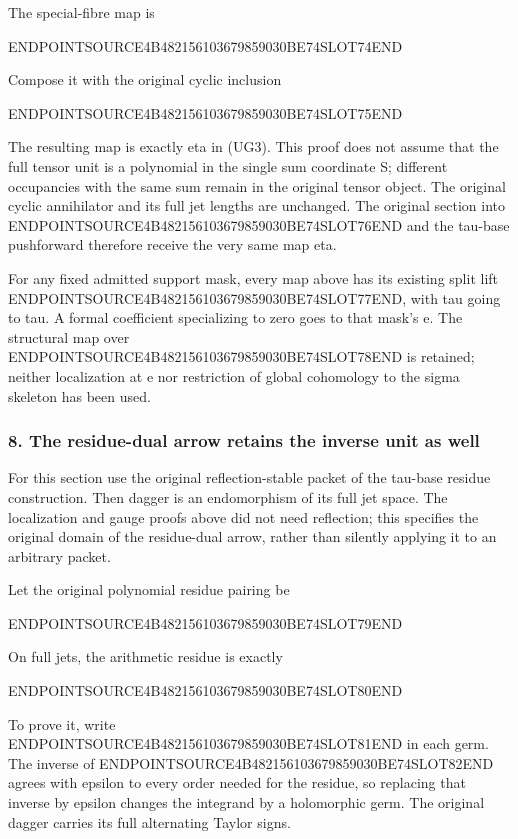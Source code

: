 The special-fibre map is

ENDPOINTSOURCE4B482156103679859030BE74SLOT74END

Compose it with the original cyclic inclusion

ENDPOINTSOURCE4B482156103679859030BE74SLOT75END

The resulting map is exactly eta in (UG3). This proof does not assume that the full tensor unit is a polynomial in the single sum coordinate S; different occupancies with the same sum remain in the original tensor object. The original cyclic annihilator and its full jet lengths are unchanged. The original section into ENDPOINTSOURCE4B482156103679859030BE74SLOT76END and the tau-base pushforward therefore receive the very same map eta.

For any fixed admitted support mask, every map above has its existing split lift ENDPOINTSOURCE4B482156103679859030BE74SLOT77END, with tau going to tau. A formal coefficient specializing to zero goes to that mask's e. The structural map over ENDPOINTSOURCE4B482156103679859030BE74SLOT78END is retained; neither localization at e nor restriction of global cohomology to the sigma skeleton has been used.

\subsubsection{8. The residue-dual arrow retains the inverse unit as well}\label{endpoint-f1_unit_gauge--the-residue-dual-arrow-retains-the-inverse-unit-as-well}

For this section use the original reflection-stable packet of the tau-base residue construction. Then dagger is an endomorphism of its full jet space. The localization and gauge proofs above did not need reflection; this specifies the original domain of the residue-dual arrow, rather than silently applying it to an arbitrary packet.

Let the original polynomial residue pairing be

ENDPOINTSOURCE4B482156103679859030BE74SLOT79END

On full jets, the arithmetic residue is exactly

ENDPOINTSOURCE4B482156103679859030BE74SLOT80END

To prove it, write ENDPOINTSOURCE4B482156103679859030BE74SLOT81END in each germ. The inverse of ENDPOINTSOURCE4B482156103679859030BE74SLOT82END agrees with epsilon to every order needed for the residue, so replacing that inverse by epsilon changes the integrand by a holomorphic germ. The original dagger carries its full alternating Taylor signs.

